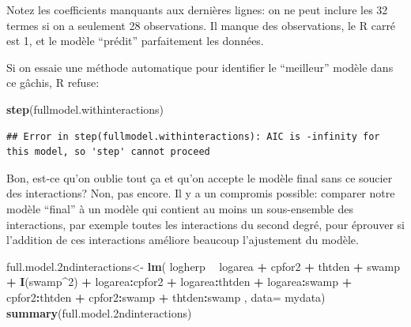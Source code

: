 \documentclass[12pt,]{book}
\newenvironment{Shaded}{\begin{snugshade}}{\end{snugshade}}
\newcommand{\DataTypeTok}[1]{\textcolor[rgb]{0.13,0.29,0.53}{#1}}
\newcommand{\DecValTok}[1]{\textcolor[rgb]{0.00,0.00,0.81}{#1}}
\newcommand{\FloatTok}[1]{\textcolor[rgb]{0.00,0.00,0.81}{#1}}
\newcommand{\KeywordTok}[1]{\textcolor[rgb]{0.13,0.29,0.53}{\textbf{#1}}}
\newcommand{\NormalTok}[1]{#1}
\newcommand{\OperatorTok}[1]{\textcolor[rgb]{0.81,0.36,0.00}{\textbf{#1}}}
\newcommand{\StringTok}[1]{\textcolor[rgb]{0.31,0.60,0.02}{#1}}
\begin{document}
Notez les coefficients manquants aux dernières lignes: on ne peut inclure les 32 termes si on a seulement 28 observations. Il manque des observations, le R carré est 1, et le modèle ``prédit'' parfaitement les données.

Si on essaie une méthode automatique pour identifier le ``meilleur'' modèle dans ce gâchis, R refuse:

\begin{Shaded}
\begin{Highlighting}[]
\KeywordTok{step}\NormalTok{(fullmodel.withinteractions)}
\end{Highlighting}
\end{Shaded}

\begin{verbatim}
## Error in step(fullmodel.withinteractions): AIC is -infinity for this model, so 'step' cannot proceed
\end{verbatim}

Bon, est-ce qu'on oublie tout ça et qu'on accepte le modèle final sans ce soucier des interactions? Non, pas encore. Il y a un compromis possible: comparer notre modèle ``final'' à un modèle qui contient au moins un sous-ensemble des interactions, par exemple toutes les interactions du second degré, pour éprouver si l'addition de ces interactions améliore beaucoup l'ajustement du modèle.

\begin{Shaded}
\begin{Highlighting}[]
\NormalTok{full.model}\FloatTok{.2}\NormalTok{ndinteractions<-}\StringTok{ }\KeywordTok{lm}\NormalTok{(}
\NormalTok{  logherp }\OperatorTok{~}\StringTok{ }\NormalTok{logarea }\OperatorTok{+}\StringTok{ }\NormalTok{cpfor2 }\OperatorTok{+}\StringTok{ }\NormalTok{thtden }\OperatorTok{+}\StringTok{ }\NormalTok{swamp }\OperatorTok{+}\StringTok{ }\KeywordTok{I}\NormalTok{(swamp}\OperatorTok{^}\DecValTok{2}\NormalTok{)}
    \OperatorTok{+}\StringTok{ }\NormalTok{logarea}\OperatorTok{:}\NormalTok{cpfor2}
    \OperatorTok{+}\StringTok{ }\NormalTok{logarea}\OperatorTok{:}\NormalTok{thtden}
    \OperatorTok{+}\StringTok{ }\NormalTok{logarea}\OperatorTok{:}\NormalTok{swamp}
    \OperatorTok{+}\StringTok{ }\NormalTok{cpfor2}\OperatorTok{:}\NormalTok{thtden}
    \OperatorTok{+}\StringTok{ }\NormalTok{cpfor2}\OperatorTok{:}\NormalTok{swamp}
    \OperatorTok{+}\StringTok{ }\NormalTok{thtden}\OperatorTok{:}\NormalTok{swamp}
\NormalTok{ , }\DataTypeTok{data=}\NormalTok{ mydata)}
\KeywordTok{summary}\NormalTok{(full.model}\FloatTok{.2}\NormalTok{ndinteractions)}
\end{Highlighting}
\end{Shaded}
\end{document}
